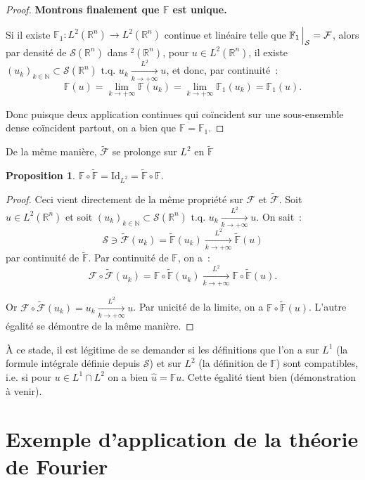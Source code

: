 \documentclass{report}
\newcommand{\R}{{\mathbb R}}
\newcommand{\N}{{\mathbb N}}
\newcommand{\tq}{\text{ t.q. }}
\newcommand{\st}{\tq}
\newcommand{\pinfty}{{+\infty}}
\newcommand{\Id}{\mathrm {Id}}
\newtheorem{prp}[thm]{Proposition}
\theoremstyle{definition}
\theoremstyle{remark}
\begin{document}
\begin{proof}
\textbf{Montrons finalement que $\mathbb F$ est unique.}

Si il existe $\mathbb F_1 : L^2(\R^n) \to L^2(\R^n)$ continue et linéaire telle que $\mathbb F_1\sVert[2]_{\mathcal S} = \mathcal F$, alors par densité de $\mathcal S(\R^n)$
dans $^2(\R^n)$, pour $u \in L^2(\R^n)$, il existe $(u_k)_{k \in \N} \subset \mathcal S(\R^n) \tq u_k \xrightarrow[k \to \pinfty]{L^2} u$, et donc, par continuité~:
\[\mathbb F(u) = \lim_{k \to \pinfty} \mathbb F(u_k) = \lim_{k \to \pinfty} \mathbb F_1(u_k) = \mathbb F_1(u).\]

Donc puisque deux application continues qui coïncident sur une sous-ensemble dense coïncident partout, on a bien que $\mathbb F = \mathbb F_1$.
\end{proof}

De la même manière, $\tilde {\mathcal F}$ se prolonge sur $L^2$ en $\tilde {\mathbb F}$

\begin{prp} $\mathbb F \circ \tilde {\mathbb F} = \Id_{L^2} = \tilde {\mathbb F} \circ \mathbb F$.
\end{prp}

\begin{proof} Ceci vient directement de la même propriété sur $\mathcal F$ et $\tilde {\mathcal F}$. Soit $u \in L^2(\R^n)$ et soit
$(u_k)_{k \in \N} \subset \mathcal S(\R^n) \st u_k \xrightarrow[k \to \pinfty]{L^2} u$. On sait~:
\[\mathcal S \ni \tilde {\mathcal F}(u_k) = \tilde {\mathbb F}(u_k) \xrightarrow[k \to \pinfty]{L^2} \tilde {\mathbb F}(u)\]
par continuité de $\tilde {\mathbb F}$. Par continuité de $\mathbb F$, on a~:
\[\mathcal F \circ \tilde {\mathcal F}(u_k) = \mathbb F \circ \tilde {\mathbb F}(u_k) \xrightarrow[k \to \pinfty]{L^2} \mathbb F \circ \tilde {\mathbb F}(u).\]

Or $\mathcal F \circ \tilde {\mathcal F}(u_k) = u_k \xrightarrow[k \to \pinfty]{L^2} u$. Par unicité de la limite, on a $\mathbb F \circ \tilde {\mathbb F}(u)$.
L'autre égalité se démontre de la même manière.
\end{proof}

À ce stade, il est légitime de se demander si les définitions que l'on a sur $L^1$ (la formule intégrale définie depuis $\mathcal S$) et sur $L^2$ (la définition de $\mathbb F$)
sont compatibles, i.e. si pour $u \in L^1 \cap L^2$ on a bien $\hat u = \mathbb Fu$. Cette égalité tient bien (démonstration à venir).

\section{Exemple d'application de la théorie de Fourier}
\end{document}
